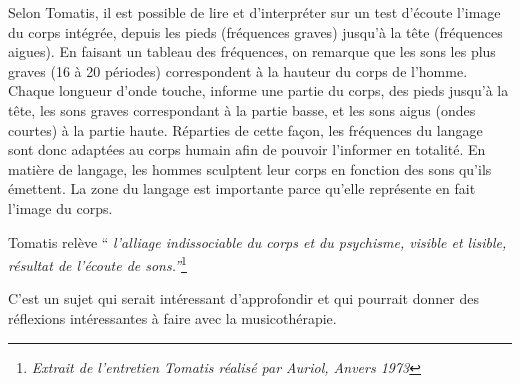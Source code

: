 Selon Tomatis, il est possible de lire et d'interpréter sur un test
d'écoute l'image du corps intégrée, depuis les pieds (fréquences graves)
jusqu'à la tête (fréquences aigues). En faisant un tableau des fréquences,
on remarque que les sons les plus graves (16 à 20 périodes) correspondent
à la hauteur du corps de l'homme. Chaque longueur d'onde touche, informe
une partie du corps, des pieds jusqu'à la tête, les sons graves correspondant
à la partie basse, et les sons aigus (ondes courtes) à la partie haute.
Réparties de cette façon, les fréquences du langage sont donc adaptées
au corps humain afin de pouvoir l'informer en totalité. En matière
de langage, les hommes sculptent leur corps en fonction des sons qu'ils
émettent. La zone du langage est importante parce qu'elle représente
en fait l'image du corps.

Tomatis relève ``\emph{ l'alliage indissociable du corps et du psychisme,
visible et lisible, résultat de l'écoute de sons.''}\footnote{\emph{Extrait de l'entretien Tomatis réalisé par Auriol, Anvers 1973}}

C'est un sujet qui serait intéressant d'approfondir et qui pourrait
donner des réflexions intéressantes à faire avec la musicothérapie.
